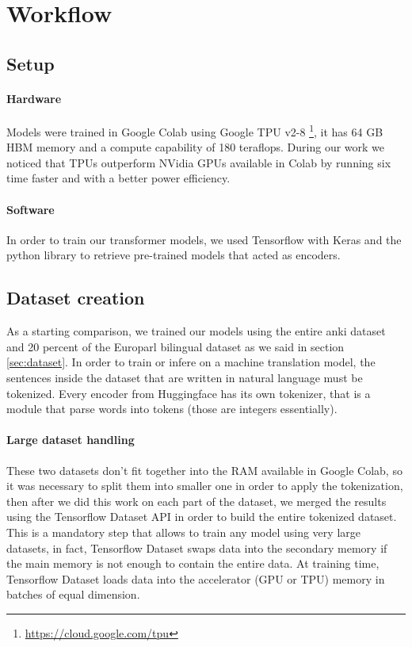 \section{Workflow}
\subsection{Setup}
\paragraph{Hardware}
Models were trained in Google Colab using Google TPU v2-8 \footnote{\url{https://cloud.google.com/tpu}},  it has 64 GB HBM memory and a compute capability of 180 teraflops. During our work we noticed that TPUs outperform NVidia GPUs available in Colab by running six time faster and with a better power efficiency.
\paragraph{Software}
In order to train our transformer models, we used Tensorflow with Keras \cite{keras_io} and the \cite{huggingface_co} python library to retrieve pre-trained models that acted as encoders.

\subsection{Dataset creation}
As a starting comparison, we trained our models using the entire anki dataset and 20 percent of the Europarl bilingual dataset as we said in section \ref{sec:dataset}. In order to train or infere on a machine translation model, the sentences inside the dataset that are written in natural language must be tokenized. Every encoder from Huggingface has its own tokenizer, that is a module that parse words into tokens (those are integers essentially).

\paragraph{Large dataset handling} These two datasets don't fit together into the RAM available in Google Colab, so it was necessary to split them into smaller one in order to apply the tokenization, then after we did this work on each part of the dataset, we merged the results using the Tensorflow Dataset API in order to build the entire tokenized dataset. This is a mandatory step that allows to train any model using very large datasets, in fact, Tensorflow Dataset swaps data into the secondary memory if the main memory is not enough to contain the entire data. At training time, Tensorflow Dataset loads data into the accelerator (GPU or TPU) memory in batches of equal dimension. 

